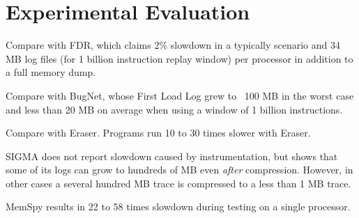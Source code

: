 \section{Experimental Evaluation}
Compare with FDR, which claims 2\% slowdown in a typically scenario
and 34 MB log files (for 1 billion instruction replay window)
per processor in addition to a full memory dump.

Compare with BugNet, whose First Load Log grew to ~100 MB in the worst
case and less than 20 MB on average when using a window of 1
billion instructions.

Compare with Eraser.  Programs run 10 to 30 times slower with Eraser.

SIGMA does not report slowdown caused by instrumentation, but shows
that some of its logs can grow to hundreds of MB even \emph{after} compression.
However, in other cases a several hundred MB trace is compressed
to a less than 1 MB trace.

MemSpy results in 22 to 58 times slowdown during testing on a single processor.